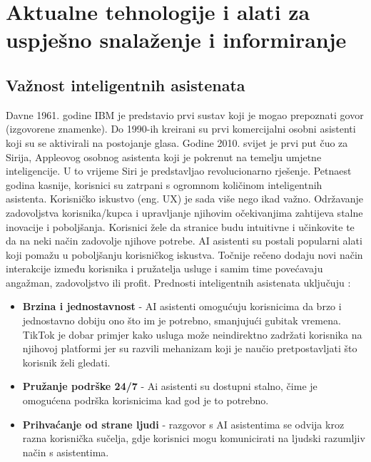 \documentclass[]{foi}
\begin{document}



\chapter{Aktualne tehnologije i alati za uspješno snalaženje i informiranje}
\section{Važnost inteligentnih asistenata}

Davne 1961. godine IBM je predstavio prvi sustav koji je mogao prepoznati govor (izgovorene znamenke). Do 1990-ih kreirani su prvi komercijalni 
osobni asistenti koji su se aktivirali na postojanje glasa. Godine 2010. svijet je prvi put čuo za Sirija, Appleovog osobnog asistenta koji je 
pokrenut na temelju umjetne inteligencije. U to vrijeme Siri je predstavljao revolucionarno rješenje. Petnaest godina kasnije, korisnici su 
zatrpani s ogromnom količinom inteligentnih asistenta. Korisničko iskustvo (eng. UX) je sada više nego ikad važno. Održavanje zadovoljstva 
korisnika/kupca i upravljanje njihovim očekivanjima zahtijeva stalne inovacije i poboljšanja. Korisnici žele da stranice budu intuitivne i učinkovite
te da na neki način zadovolje njihove potrebe. AI asistenti su postali popularni alati koji pomažu u poboljšanju korisničkog iskustva.
Točnije rečeno dodaju novi način interakcije između korisnika i pružatelja usluge i samim time povećavaju angažman, zadovoljstvo ili profit.
Prednosti inteligentnih asistenata uključuju \cite{buchan2024ai}:
\begin{itemize}
    \item \textbf{Brzina i jednostavnost} - AI asistenti omogućuju korisnicima da brzo i jednostavno dobiju ono što im je potrebno, smanjujući
    gubitak vremena. TikTok je dobar primjer kako usluga može neindirektno zadržati korisnika na njihovoj platformi jer su razvili mehanizam koji
    je naučio pretpostavljati što korisnik želi gledati.
    \item \textbf{Pružanje podrške 24/7} - Ai asistenti su dostupni stalno, čime je omogućena podrška korisnicima kad god je to potrebno. 
    \item \textbf{Prihvaćanje od strane ljudi} - razgovor s AI asistentima se odvija kroz razna korisnička sučelja, gdje korisnici mogu
    komunicirati na ljudski razumljiv način s asistentima. 
\end{itemize}
\end{document}
